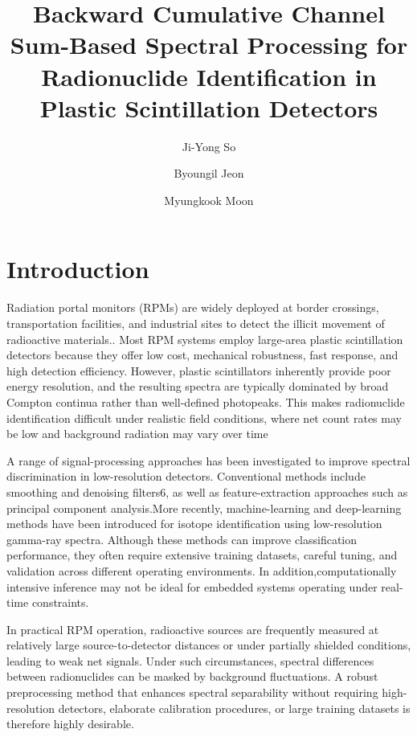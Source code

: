 \documentclass[fleqn, 10pt]{wlscirep}
\title{Backward Cumulative Channel Sum-Based Spectral Processing for Radionuclide Identification in Plastic Scintillation Detectors}
\author[1]{Ji-Yong So}
\author[2]{Byoungil Jeon}
\author[1,*]{Myungkook Moon}
\affil[1]{Korea Atomic Energy Research Institute, Neutron Science Division, Daejeon, 34057, Korea}
\affil[2]{Korea Atomic Energy Research Institute, Applied Artificial Intelligence Section, Daejeon, 34057, Korea}
\affil[*]{moonmk@kaeri.re.kr}
\begin{document}
\flushbottom
\maketitle

\thispagestyle{empty}


\section*{Introduction}

Radiation portal monitors (RPMs) are widely deployed at border crossings, transportation facilities, and industrial sites to detect the illicit movement of radioactive materials.\cite{Sicilliano2005Comparision, Bertrand2014Current,Ely2006TheUse}. Most RPM systems employ large-area plastic scintillation detectors because they offer low cost, mechanical robustness, fast response, and high detection efficiency\cite{Hevener2013EWindow, Lee2020Radioisotope, Paff2017Spectral}. However, plastic scintillators inherently provide poor energy resolution, and the resulting spectra are typically dominated by broad Compton continua rather than well-defined photopeaks. This makes radionuclide identification difficult under realistic field conditions, where net count rates may be low and background radiation may vary over time 

A range of signal-processing approaches has been investigated to improve spectral discrimination in low-resolution detectors. Conventional methods include smoothing and denoising filters6, as well as feature-extraction approaches such as principal component analysis\cite{Runkle2006Analysis,Kim2019InvMat}.More recently, machine-learning and deep-learning methods have been introduced for isotope identification using low-resolution gamma-ray spectra\cite{Kim2019ANN, Lee2023Radionuclide,Jeon2021CompML}. Although these methods can improve classification performance, they often require extensive training datasets, careful tuning, and validation across different operating environments. In addition,computationally intensive inference may not be ideal for embedded systems operating under real-time constraints.

In practical RPM operation, radioactive sources are frequently measured at relatively large source-to-detector distances or under partially shielded conditions, leading to weak net signals. Under such circumstances, spectral differences between radionuclides can be masked by background fluctuations. A robust preprocessing method that enhances spectral separability without requiring high-resolution detectors, elaborate calibration procedures, or large training datasets is therefore highly desirable.
\end{document}
